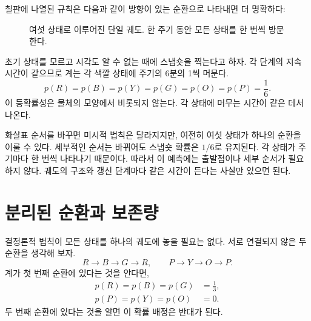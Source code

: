 칠판에 나열된 규칙은 다음과 같이 방향이 있는 순환으로 나타내면 더 명확하다:
\begin{figure}[htbp]
\centering
{}
\caption{여섯 상태로 이루어진 단일 궤도. 한 주기 동안 모든 상태를 한 번씩 방문한다.}
\label{fig:sm1-six-cycle}
\end{figure}

초기 상태를 모르고 시각도 알 수 없는 때에 스냅숏을 찍는다고 하자. 각 단계의 지속 시간이 같으므로 계는 각 색깔 상태에 주기의 6분의 1씩 머문다.
\begin{equation}
 p(R)=p(B)=p(Y)=p(G)=p(O)=p(P)=\frac16.
 \label{eq:sm1-uniform-cycle}
\end{equation}
이 등확률성은 물체의 모양에서 비롯되지 않는다. 각 상태에 머무는 시간이 같은 데서 나온다.

화살표 순서를 바꾸면 미시적 법칙은 달라지지만, 여전히 여섯 상태가 하나의 순환을 이룰 수 있다. 세부적인 순서는 바뀌어도 스냅숏 확률은 \(1/6\)로 유지된다. 각 상태가 주기마다 한 번씩 나타나기 때문이다. 따라서 이 예측에는 출발점이나 세부 순서가 필요하지 않다. 궤도의 구조와 갱신 단계마다 같은 시간이 든다는 사실만 있으면 된다.

\begin{classroomqa}
\end{classroomqa}

\section{분리된 순환과 보존량}

결정론적 법칙이 모든 상태를 하나의 궤도에 놓을 필요는 없다. 서로 연결되지 않은 두 순환을 생각해 보자.
\begin{equation}
 R\longrightarrow B\longrightarrow G\longrightarrow R,
 \qquad
 P\longrightarrow Y\longrightarrow O\longrightarrow P.
 \label{eq:sm1-two-cycles}
\end{equation}
계가 첫 번째 순환에 있다는 것을 안다면,
\begin{equation}
 \begin{aligned}
 p(R)=p(B)=p(G)&=\frac13,\\
 p(P)=p(Y)=p(O)&=0.
 \end{aligned}
\end{equation}
두 번째 순환에 있다는 것을 알면 이 확률 배정은 반대가 된다.

